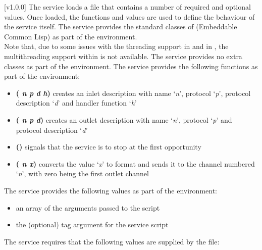 [v1.0.0]
The \CLF{} service loads a \CL{} file that contains a number of required and optional
values.
Once loaded, the \CL{} functions and values are used to define the behaviour of the
service itself.
The \CLF{} service provides the standard classes of \ECL{} (Embeddable Common Lisp) as part
of the \CL{} environment.\\

Note that, due to some issues with the threading support in \ECL{} and in \yarp{}, the
multithreading support within \ECL{} is not available.
\secondaryEnd
{}
The \CLF{} service provides no extra classes as part of the \CL{} environment.
\secondaryEnd
{}
The \CLF{} service provides the following functions as part of the \CL{} environment:
\begin{itemize}
\item\textbf{( \textit{n} \textit{p} \textit{d} \textit{h})}
\longDash{} creates an inlet description with name `\textit{n}', protocol `\textit{p}',
protocol description `\textit{d}' and handler function `\textit{h}'
\item\exSp\textbf{( \textit{n} \textit{p} \textit{d})}
\longDash{} creates an outlet description with name `\textit{n}', protocol `\textit{p}'
and protocol description `\textit{d}' 
\item\exSp\textbf{()} \longDash{} signals that the service is to stop
at the first opportunity
\item\exSp\textbf{( \textit{n} \textit{x})} \longDash{} converts the
value `\textit{x}' to \yarp{} format and sends it to the channel numbered `\textit{n}',
with zero being the first outlet channel
\end{itemize}
\secondaryEnd
{}
The \CLF{} service provides the following values as part of the \CL{} environment:
\begin{itemize}
\item\textbf{} \longDash{} an array of the arguments passed to the
script
\item\exSp\textbf{} \longDash{} the (optional) tag argument for the service
script
\end{itemize}
\secondaryEnd
\condPage
{}
The \CLF{} service requires that the following values are supplied by the \CL{} file:
